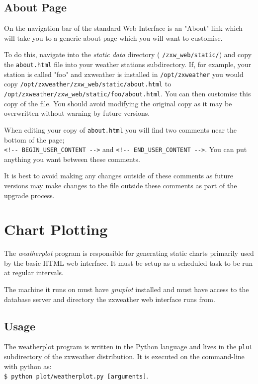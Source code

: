 \documentclass[a4paper,10pt,draft]{book}
\begin{document}
\subsection{About Page}
On the navigation bar of the standard Web Interface is an "About" link which will take you to a generic about page which you will want to customise.

To do this, navigate into the \emph{static data} directory ( \verb|/zxw_web/static/|) and copy the \verb|about.html| file into your weather stations subdirectory. If, for example, your station is called "foo" and zxweather is installed in \verb|/opt/zxweather| you would copy \verb|/opt/zxweather/zxw_web/static/about.html| to \\ \verb|/opt/zxweather/zxw_web/static/foo/about.html|. You can then customise this copy of the file. You should avoid modifying the original copy as it may be overwritten without warning by future versions.

When editing your copy of \verb|about.html| you will find two comments near the bottom of the page; \\
\verb|<!-- BEGIN_USER_CONTENT -->| and \verb|<!-- END_USER_CONTENT -->|. You can put anything you want between these comments.

It is best to avoid making any changes outside of these comments as future versions may make changes to the file outside these comments as part of the upgrade process.


\section{Chart Plotting}
\label{sec_chart_plotting}

The \emph{weatherplot} program is responsible for generating static charts primarily used by the basic HTML web interface. It must be setup as a scheduled task to be run at regular intervals.

The machine it runs on must have \emph{gnuplot} installed and must have access to the database server and directory the zxweather web interface runs from.

\subsection{Usage}

The weatherplot program is written in the Python language and lives in the \verb|plot| subdirectory of the zxweather distribution. It is executed on the command-line with python as: \\ \verb|$ python plot/weatherplot.py [arguments]|.
\end{document}
